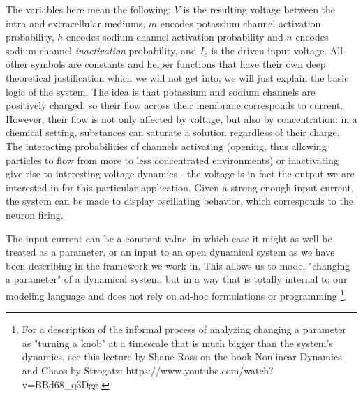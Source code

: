 The variables here mean the following: $V$ is the resulting voltage between the intra and extracellular mediums, $m$ encodes potassium channel activation probability, $h$ encodes sodium channel activation probability and $n$ encodes sodium channel \textit{inactivation} probability, and $I_e$ is the driven input voltage. All other symbols are constants and helper functions that have their own deep theoretical justification which we will not get into, we will just explain the basic logic of the system. The idea is that potassium and sodium channels are positively charged, so their flow across their membrane corresponds to current. However, their flow is not only affected by voltage, but also by concentration: in a chemical setting, substances can saturate a solution regardless of their charge. The interacting probabilities of channels activating (opening, thus allowing particles to flow from more to less concentrated environments) or inactivating give rise to interesting voltage dynamics - the voltage is in fact the output we are interested in for this particular application. Given a strong enough input current, the system can be made to display oscillating behavior, which corresponds to the neuron firing.

The input current can be a constant value, in which case it might as well be treated as a parameter, or an input to an open dynamical system as we have been describing in the framework we work in. This allows us to model "changing a parameter" of a dynamical system, but in a way that is totally internal to our modeling language and does not rely on ad-hoc formulations or programming \footnote{For a description of the informal process of analyzing changing a parameter as "turning a knob" at a timescale that is much bigger than the system's dynamics, see this lecture by Shane Ross on the book Nonlinear Dynamics and Chaos by Strogatz: https://www.youtube.com/watch?v=BBd68\_q3Dgg.}.

